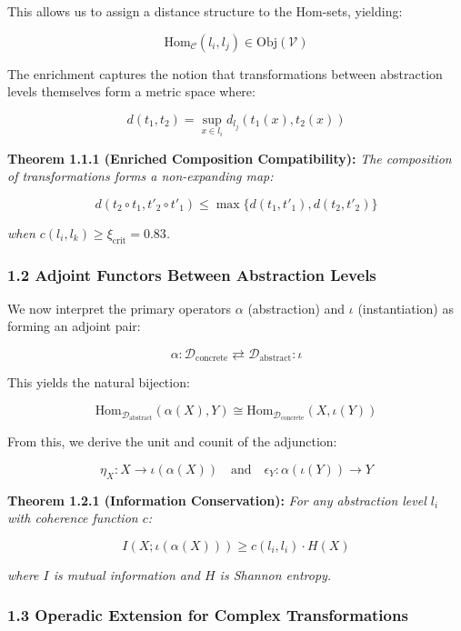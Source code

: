 \documentclass[
]{article}
\begin{document}
This allows us to assign a distance structure to the Hom-sets, yielding:

\[\text{Hom}_{\mathcal{C}}(l_i, l_j) \in \text{Obj}(\mathcal{V})\]

The enrichment captures the notion that transformations between
abstraction levels themselves form a metric space where:

\[d(t_1, t_2) = \sup_{x \in l_i} d_{l_j}(t_1(x), t_2(x))\]

\textbf{Theorem 1.1.1 (Enriched Composition Compatibility):} \emph{The
composition of transformations forms a non-expanding map:}

\[d(t_2 \circ t_1, t'_2 \circ t'_1) \leq \max\{d(t_1, t'_1), d(t_2, t'_2)\}\]

\emph{when \(c(l_i, l_k) \geq \xi_{\text{crit}} = 0.83\).}

\subsubsection{1.2 Adjoint Functors Between Abstraction
Levels}\label{adjoint-functors-between-abstraction-levels}

We now interpret the primary operators \(\alpha\) (abstraction) and
\(\iota\) (instantiation) as forming an adjoint pair:

\[\alpha : \mathcal{D}_{\text{concrete}} \rightleftarrows \mathcal{D}_{\text{abstract}} : \iota\]

This yields the natural bijection:

\[\text{Hom}_{\mathcal{D}_{\text{abstract}}}(\alpha(X), Y) \cong \text{Hom}_{\mathcal{D}_{\text{concrete}}}(X, \iota(Y))\]

From this, we derive the unit and counit of the adjunction:

\[\eta_X : X \to \iota(\alpha(X)) \quad \text{and} \quad \epsilon_Y : \alpha(\iota(Y)) \to Y\]

\textbf{Theorem 1.2.1 (Information Conservation):} \emph{For any
abstraction level \(l_i\) with coherence function \(c\):}

\[I(X; \iota(\alpha(X))) \geq c(l_i, l_i) \cdot H(X)\]

\emph{where \(I\) is mutual information and \(H\) is Shannon entropy.}

\subsubsection{1.3 Operadic Extension for Complex
Transformations}\label{operadic-extension-for-complex-transformations}
\end{document}
